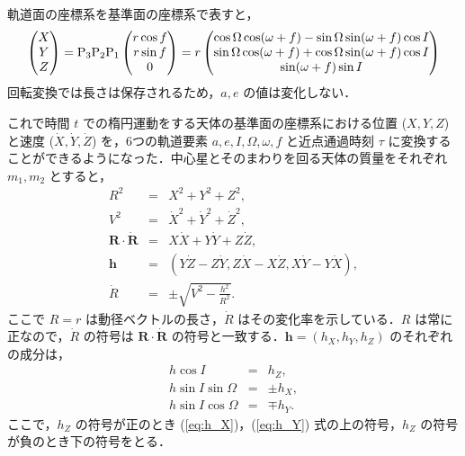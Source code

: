 \documentclass[11pt,a4paper,oneside,onecolumn]{jarticle}
\begin{document}
軌道面の座標系を基準面の座標系で表すと，
\begin{equation}
\begin{pmatrix}
X\\
Y\\
Z\\
\end{pmatrix}
= {\rm{\bm P}}_3 {\rm{\bm P}}_2 {\rm{\bm P}}_1
\begin{pmatrix}
r \cos f\\
r \sin f\\
0\\
\end{pmatrix}
= r 
\begin{pmatrix}
\cos \Omega \cos (\omega + f) - \sin \Omega \sin (\omega + f) \cos I\\
\sin \Omega \cos (\omega + f) + \cos \Omega \sin (\omega + f) \cos I\\
\sin (\omega + f) \sin I\\
\end{pmatrix}
\label{eq:xyzXYZ}
\end{equation}
回転変換では長さは保存されるため，$a, e$ の値は変化しない．

これで時間 $t$ での楕円運動をする天体の基準面の座標系における位置 ($X, Y, Z$) と速度 ($\dot{X}, \dot{Y}, \dot{Z}$) を，6つの軌道要素 $a, e, I, \Omega, \omega, f$ と近点通過時刻 $\tau$ に変換することができるようになった．中心星とそのまわりを回る天体の質量をそれぞれ $m_1, m_2$ とすると，
\begin{eqnarray}
R^2 & = & X^2 + Y^2 + Z^2, \label{eq:R}\\
V^2 & = & \dot{X}^2 + \dot{Y}^2 + \dot{Z}^2, \label{eq:Rdot}\\
{\bm R} \cdot \dot{{\bm R}} & = & X \dot{X} + Y \dot{Y} + Z \dot{Z}, \\
{\bm h} & = & (Y \dot{Z} - Z \dot{Y}, Z \dot{X} - X \dot{Z}, X \dot{Y} - Y \dot{X}), \\
\dot{R} & = & \pm \sqrt{V^2 - \frac{h^2}{R^2}}.
\end{eqnarray}
ここで $R = r$ は動径ベクトルの長さ，$\dot{R}$ はその変化率を示している．$R$ は常に正なので，$\dot{R}$ の符号は ${\bm R} \cdot \dot{{\bm R}}$ の符号と一致する．${\bm h} = (h_X, h_Y, h_Z)$ のそれぞれの成分は，
\begin{eqnarray}
h \cos I & = & h_Z, \label{eq:h_Z}\\
h \sin I \sin \Omega & = & \pm h_X, \label{eq:h_X}\\
h \sin I \cos \Omega & = & \mp h_Y. \label{eq:h_Y}
\end{eqnarray}
ここで，$h_Z$ の符号が正のとき (\ref{eq:h_X})，(\ref{eq:h_Y}) 式の上の符号，$h_Z$ の符号が負のとき下の符号をとる．
\end{document}
